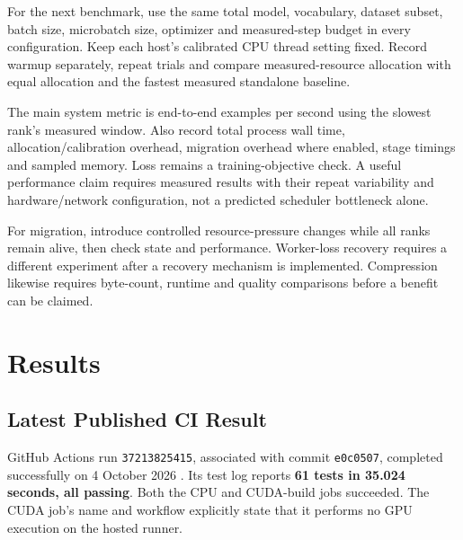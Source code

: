 For the next benchmark, use the same total model, vocabulary, dataset subset, batch size, microbatch size, optimizer and measured-step budget in every configuration. Keep each host's calibrated CPU thread setting fixed. Record warmup separately, repeat trials and compare measured-resource allocation with equal allocation and the fastest measured standalone baseline.

The main system metric is end-to-end examples per second using the slowest rank's measured window. Also record total process wall time, allocation/calibration overhead, migration overhead where enabled, stage timings and sampled memory. Loss remains a training-objective check. A useful performance claim requires measured results with their repeat variability and hardware/network configuration, not a predicted scheduler bottleneck alone.

For migration, introduce controlled resource-pressure changes while all ranks remain alive, then check state and performance. Worker-loss recovery requires a different experiment after a recovery mechanism is implemented. Compression likewise requires byte-count, runtime and quality comparisons before a benefit can be claimed.

\section{Results}

\subsection{Latest Published CI Result}

GitHub Actions run \texttt{37213825415}, associated with commit \texttt{e0c0507}, completed successfully on 4 October 2026 \cite{ci}. Its test log reports \textbf{61 tests in 35.024 seconds, all passing}. Both the CPU and CUDA-build jobs succeeded. The CUDA job's name and workflow explicitly state that it performs no GPU execution on the hosted runner.

